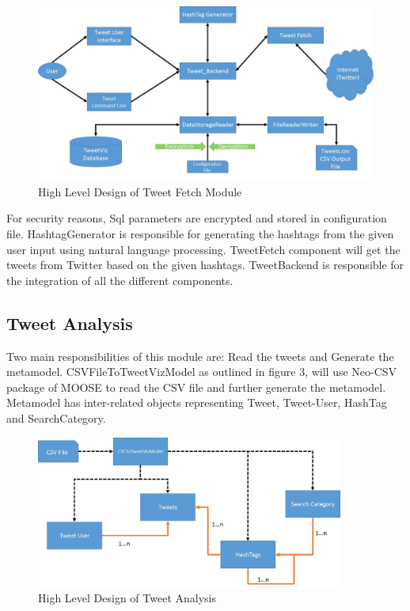 \documentclass[11pt]{article}
\begin{document}
\begin{figure}[h]
\centering
\includegraphics[width=\textwidth]{TweetFetch.jpg}
\caption{High Level Design of Tweet Fetch Module}
\end{figure}

For security reasons, Sql parameters are encrypted and stored in configuration file. HashtagGenerator is responsible for generating the hashtags from the given user input using natural language processing. TweetFetch component will get the tweets from Twitter based on the given hashtags. TweetBackend is responsible for the integration of all the different components.

\subsection{Tweet Analysis}
Two main responsibilities of this module are: Read the tweets and Generate the metamodel. CSVFileToTweetVizModel as outlined in figure 3, will use Neo-CSV package of MOOSE to read the CSV file and further generate the metamodel. Metamodel has inter-related objects representing Tweet, Tweet-User, HashTag and SearchCategory. 

\begin{figure}[h]
\centering
\includegraphics[width=\textwidth, height=5cm]{TweetAnalysis.jpg}
\caption{High Level Design of Tweet Analysis}
\end{figure}
\end{document}
